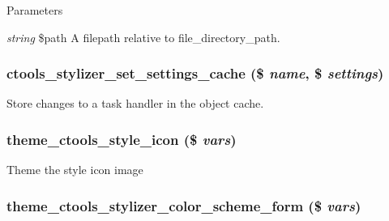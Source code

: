 \begin{DoxyParams}{Parameters}
\item[{\em string}]\$path A filepath relative to file\_\-directory\_\-path. \end{DoxyParams}
\hypertarget{includes_2stylizer_8inc_a1e9a6f376ae340e6a11781cfa685cf93}{
\subsubsection[{ctools\_\-stylizer\_\-set\_\-settings\_\-cache}]{\setlength{\rightskip}{0pt plus 5cm}ctools\_\-stylizer\_\-set\_\-settings\_\-cache (\$ {\em name}, \/  \$ {\em settings})}}
\label{includes_2stylizer_8inc_a1e9a6f376ae340e6a11781cfa685cf93}
Store changes to a task handler in the object cache. \hypertarget{includes_2stylizer_8inc_a1510c1f74e2722976f9b2703d766540b}{
\subsubsection[{theme\_\-ctools\_\-style\_\-icon}]{\setlength{\rightskip}{0pt plus 5cm}theme\_\-ctools\_\-style\_\-icon (\$ {\em vars})}}
\label{includes_2stylizer_8inc_a1510c1f74e2722976f9b2703d766540b}
Theme the style icon image \hypertarget{includes_2stylizer_8inc_a2ed3629828e5cfe1c833bbf3cc9ddd05}{
\subsubsection[{theme\_\-ctools\_\-stylizer\_\-color\_\-scheme\_\-form}]{\setlength{\rightskip}{0pt plus 5cm}theme\_\-ctools\_\-stylizer\_\-color\_\-scheme\_\-form (\$ {\em vars})}}
\label{includes_2stylizer_8inc_a2ed3629828e5cfe1c833bbf3cc9ddd05}

